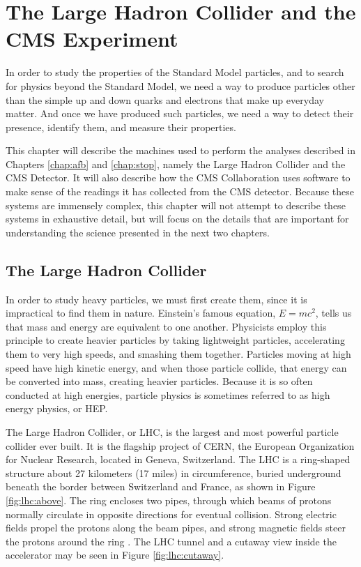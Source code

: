 \chapter{The Large Hadron Collider and the CMS Experiment}
\label{chap:hardware}

In order to study the properties of the Standard Model particles, and
to search for physics beyond the Standard Model, we need a way to
produce particles other than the simple up and down quarks and
electrons that make up everyday matter. And once we have produced such
particles, we need a way to detect their presence, identify them, and
measure their properties.

This chapter will describe the machines used to perform
the analyses described in Chapters \ref{chap:afb} and \ref{chap:stop},
namely the Large Hadron Collider and the CMS Detector. It
will also describe how the CMS Collaboration uses software to make sense of
the readings it has collected from the CMS detector. Because these
systems are immensely complex, this chapter will not attempt to
describe these systems in exhaustive detail, but will focus on the details that are
important for understanding the science presented in the next two
chapters. %

\section{The Large Hadron Collider}
\label{sec:lhc}

In order to study heavy particles, we must first create them, since
it is impractical to find them in nature.
Einstein's famous equation, $E = mc^2$, tells us that mass and energy
are equivalent to one another. Physicists employ this principle to create
heavier particles by taking lightweight particles, accelerating them to very high
speeds, and smashing them together. Particles moving at high speed
have high kinetic energy, and when those particle collide, that energy
can be converted into mass, creating heavier particles. Because it is
so often conducted at high energies, particle physics is sometimes
referred to as high energy physics, or HEP.

The Large Hadron Collider, or LHC, is the largest and most
powerful particle collider ever built.
It is the flagship project of CERN, the European Organization
for Nuclear Research, located in Geneva, Switzerland.
The LHC is a ring-shaped structure about 27 kilometers (17 miles) in circumference,
buried underground beneath the border between Switzerland and
France, as shown in Figure \ref{fig:lhc:above}. The ring encloses two
pipes, through which beams of protons normally circulate in opposite
directions for eventual collision. Strong electric fields propel the protons along the beam
pipes, and strong magnetic fields steer the protons around the ring
\cite{lhc}. The LHC tunnel and a cutaway view inside the accelerator
may be seen in Figure \ref{fig:lhc:cutaway}.

